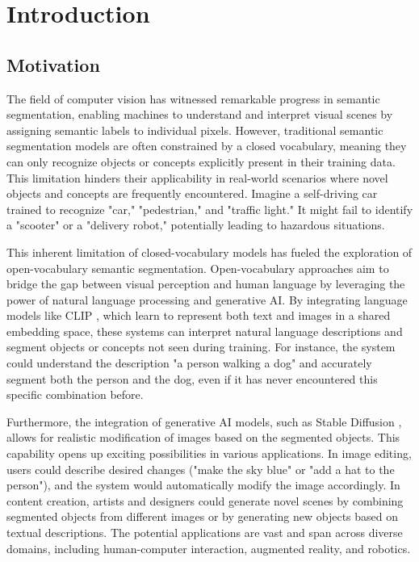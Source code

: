 \chapter{Introduction}

\section{Motivation}

The field of computer vision has witnessed remarkable progress in semantic segmentation, enabling machines to understand and interpret visual scenes by assigning semantic labels to individual pixels. However, traditional semantic segmentation models are often constrained by a closed vocabulary, meaning they can only recognize objects or concepts explicitly present in their training data. This limitation hinders their applicability in real-world scenarios where novel objects and concepts are frequently encountered. Imagine a self-driving car trained to recognize "car," "pedestrian," and "traffic light." It might fail to identify a "scooter" or a "delivery robot," potentially leading to hazardous situations.

This inherent limitation of closed-vocabulary models has fueled the exploration of open-vocabulary semantic segmentation. Open-vocabulary approaches aim to bridge the gap between visual perception and human language by leveraging the power of natural language processing and generative AI. By integrating language models like CLIP \cite{radford2021learning}, which learn to represent both text and images in a shared embedding space, these systems can interpret natural language descriptions and segment objects or concepts not seen during training. For instance, the system could understand the description "a person walking a dog" and accurately segment both the person and the dog, even if it has never encountered this specific combination before.

Furthermore, the integration of generative AI models, such as Stable Diffusion \cite{rombach2022high}, allows for realistic modification of images based on the segmented objects. This capability opens up exciting possibilities in various applications. In image editing, users could describe desired changes ("make the sky blue" or "add a hat to the person"), and the system would automatically modify the image accordingly. In content creation, artists and designers could generate novel scenes by combining segmented objects from different images or by generating new objects based on textual descriptions. The potential applications are vast and span across diverse domains, including human-computer interaction, augmented reality, and robotics.

